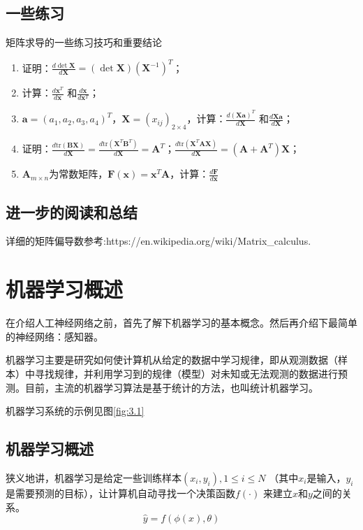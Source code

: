 \documentclass[11pt,fleqn, UTF8]{ctexbook} %
\begin{document}
\section{一些练习}
矩阵求导的一些练习技巧和重要结论
\begin{enumerate}
  \item 证明：$\frac{d\det\boldsymbol{X}}{d\boldsymbol{X}}=(\det\boldsymbol{X})(\boldsymbol{X}^{-1})^T$；
  \item 计算：$\frac{d\boldsymbol{x}^T}{d\boldsymbol{x}}$ 和$\frac{d\boldsymbol{x}}{d\boldsymbol{x}^T}$；
  \item $\boldsymbol{a}=(a_1,a_2,a_3,a_4)^T$，$\boldsymbol{X}=(x_{ij})_{2\times 4}$，计算：$\frac{d(\boldsymbol{Xa})^T}{d\boldsymbol{X}}$ 和$\frac{d\boldsymbol{Xa}}{d\boldsymbol{X}}$；
  \item 证明：$\frac{d\text{tr}(\boldsymbol{BX})}{d\boldsymbol{X}}=\frac{d\text{tr}(\boldsymbol{X}^T\boldsymbol{B}^T)}{d\boldsymbol{X}}=\boldsymbol{A}^T$；$\frac{d\text{tr}(\boldsymbol{X}^T\boldsymbol{AX})}{d\boldsymbol{X}}=(\boldsymbol{A}+\boldsymbol{A}^T)\boldsymbol{X}$；
  \item $\boldsymbol{A}_{m\times n}$为常数矩阵，$\boldsymbol{F}(\boldsymbol{x})=\boldsymbol{x}^T\boldsymbol{A}$，计算：$\frac{d\boldsymbol{F}}{d\boldsymbol{x}}$
\end{enumerate}

\section{进一步的阅读和总结}
详细的矩阵偏导数参考:{https://en.wikipedia.org/wiki/Matrix\_calculus}.

\chapter{机器学习概述}

在介绍人工神经网络之前，首先了解下机器学习的基本概念。然后再介绍下最简单的神经网络：感知器。

机器学习主要是研究如何使计算机从给定的数据中学习规律，即从观测数据（样本）中寻找规律，并利用学习到的规律（模型）对未知或无法观测的数据进行预测。目前，主流的机器学习算法是基于统计的方法，也叫统计机器学习。

机器学习系统的示例见图\ref{fig:3.1}
\section{机器学习概述}
狭义地讲，机器学习是给定一些训练样本$(x_i, y_i), 1 \leq i \leq N$ （其中$x_i$是输入，$y_i$是需要预测的目标），让计算机自动寻找一个决策函数$f(\cdot)$ 来建立$x$和$y$之间的关系。
\begin{equation}\label{3.1}
  \hat{y}=f(\phi(x),\theta)
\end{equation}
\end{document}

